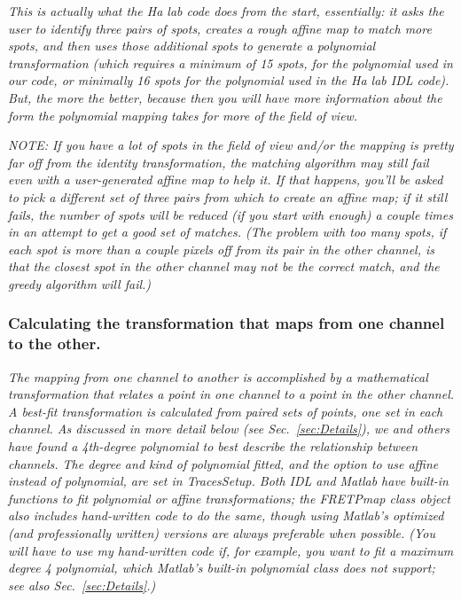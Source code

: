 \documentclass[11pt]{article}
\begin{document}
{\it This is actually what the Ha lab code does from the start, essentially: it asks the user to identify three pairs of spots, creates a rough affine map to match more spots, and then uses those additional spots to generate a polynomial transformation (which requires a minimum of 15 spots, for the polynomial used in our code, or minimally 16 spots for the polynomial used in the Ha lab IDL code).  But, the more the better, because then you will have more information about the form the polynomial mapping takes for more of the field of view.}

{\it NOTE: If you have a lot of spots in the field of view and/or the mapping is pretty far off from the identity transformation, the matching algorithm may still fail even with a user-generated affine map to help it.  If that happens, you'll be asked to pick a different set of three pairs from which to create an affine map; if it still fails, the number of spots will be reduced (if you start with enough) a couple times in an attempt to get a good set of matches. (The problem with too many spots, if each spot is more than a couple pixels off from its pair in the other channel, is that the closest spot in the other channel may not be the correct match, and the greedy algorithm will fail.)}\\


\subsubsection{Calculating the transformation that maps from one channel to the other.}

{\it The mapping from one channel to another is accomplished by a mathematical transformation that relates a point in one channel to a point in the other channel.  A best-fit transformation is calculated from paired sets of points, one set in each channel.  As discussed in more detail below (see Sec.~\ref{sec:Details}), we and others have found a 4th-degree polynomial to best describe the relationship between channels.  The degree and kind of polynomial fitted, and the option to use affine instead of polynomial, are set in TracesSetup.  Both IDL and Matlab have built-in functions to fit polynomial or affine transformations; the FRETPmap class object also includes hand-written code to do the same, though using Matlab's optimized (and professionally written) versions are always preferable when possible. (You will have to use my hand-written code if, for example, you want to fit a maximum degree 4 polynomial, which Matlab's built-in polynomial class does not support; see also Sec.~\ref{sec:Details}.)}\\
\end{document}
